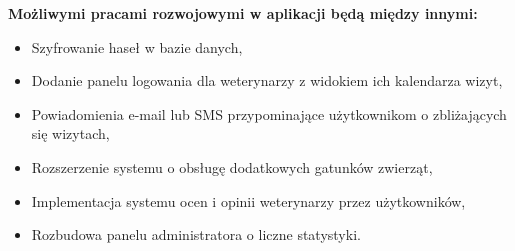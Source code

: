 \vspace{10pt}

\textbf{Możliwymi pracami rozwojowymi w aplikacji będą między innymi:}

\begin{itemize}
\item Szyfrowanie haseł w bazie danych,
\item Dodanie panelu logowania dla weterynarzy z widokiem ich kalendarza wizyt,
\item Powiadomienia e-mail lub SMS przypominające użytkownikom o zbliżających się wizytach,
\item Rozszerzenie systemu o obsługę dodatkowych gatunków zwierząt,
\item Implementacja systemu ocen i opinii weterynarzy przez użytkowników,
\item Rozbudowa panelu administratora o liczne statystyki.
\end{itemize}